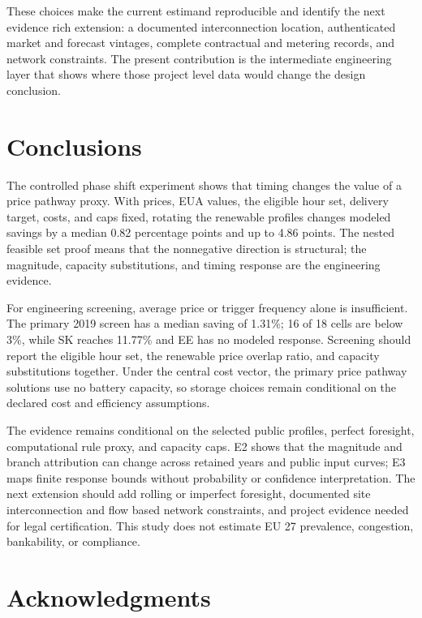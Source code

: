 \documentclass[largeformat]{interact}
\begin{document}
These choices make the current estimand reproducible and identify the
next evidence rich extension: a documented interconnection location,
authenticated market and forecast vintages, complete contractual and
metering records, and network constraints. The present contribution is
the intermediate engineering layer that shows where those project level
data would change the design conclusion.

\section{Conclusions}\label{conclusions}

The controlled phase shift experiment shows that timing changes the
value of a price pathway proxy. With prices, EUA values, the eligible
hour set, delivery target, costs, and caps fixed, rotating the renewable
profiles changes modeled savings by a median 0.82 percentage points and
up to 4.86 points. The nested feasible set proof means that the
nonnegative direction is structural; the magnitude, capacity
substitutions, and timing response are the engineering evidence.

For engineering screening, average price or trigger frequency alone is
insufficient. The primary 2019 screen has a median saving of 1.31\%; 16
of 18 cells are below 3\%, while SK reaches 11.77\% and EE has no
modeled response. Screening should report the eligible hour set, the
renewable price overlap ratio, and capacity substitutions together.
Under the central cost vector, the primary price pathway solutions use
no battery capacity, so storage choices remain conditional on the
declared cost and efficiency assumptions.

The evidence remains conditional on the selected public profiles,
perfect foresight, computational rule proxy, and capacity caps. E2 shows
that the magnitude and branch attribution can change across retained
years and public input curves; E3 maps finite response bounds without
probability or confidence interpretation. The next extension should add
rolling or imperfect foresight, documented site interconnection and flow
based network constraints, and project evidence needed for legal
certification. This study does not estimate EU 27 prevalence,
congestion, bankability, or compliance.

\section*{Acknowledgments}
\end{document}
